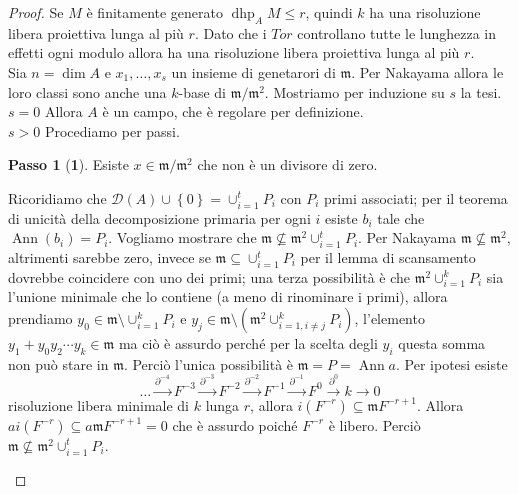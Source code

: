 \documentclass[a4paper,11pt,oneside]{book}
\newcommand{\m}{\mathfrak{m}}
\newcommand{\set}[1]{\left\{ #1 \right\}}
\DeclareMathOperator{\dhp}{dhp}
\DeclareMathOperator{\Ann}{Ann}
\theoremstyle{definition}
\newtheorem*{passo}{Passo}
\begin{document}
     \begin{proof}
      Se $M$ è finitamente generato $\dhp_AM\leq r$, quindi $k$ ha una risoluzione libera proiettiva lunga al più $r$.
      Dato che i $Tor$ controllano tutte le lunghezza in effetti ogni modulo allora ha una risoluzione libera proiettiva
      lunga al più $r$. \\
      Sia $n=\dim A$ e $x_1,\dots, x_s$ un insieme di genetarori di $\m$. Per Nakayama allora le loro classi sono anche una
      $k$-base di $\m/\m^2$. Mostriamo per induzione su $s$ la tesi.\\
      $s=0$ Allora $A$ è un campo, che è regolare per definizione.\\
      $s>0$ Procediamo per passi.\\

	      \begin{passo}[\textbf{1}]
	       Esiste $x\in \m/\m^2$ che non è un divisore di zero.
	      \end{passo}

	      Ricoridiamo che
	      $\mathcal{D}(A)\cup \set{0}=\cup^t_{i=1}P_i$ con $P_i$ primi associati; per il teorema di unicità della decomposizione
	      primaria per ogni $i$ esiste $b_i$ tale che $\Ann (b_i)=P_i$. Vogliamo mostrare che $ \m\nsubseteq \m^2 \cup^t_{i=1}P_i$.
	      Per Nakayama $\m\nsubseteq \m^2$, altrimenti sarebbe zero, invece se $ \m\subseteq\cup^t_{i=1}P_i$
	      per il lemma di scansamento dovrebbe coincidere con uno dei primi; una terza possibilità è che $\m^2\cup^k_{i=1}P_i$ 
	      sia l'unione minimale che lo contiene (a meno di rinominare i primi), allora  prendiamo 
	      $y_0\in \m \setminus\cup^k_{i=1}P_i$  e $y_j\in\m\setminus(\m^2\cup^k_{i=1,i\neq j}P_i)$, l'elemento $y_1+y_0y_2\cdots y_k\in \m$
	      ma ciò è assurdo perché per la scelta degli $y_i$ questa somma non può stare in $\m$.  Perciò l'unica possibilità è $\m=P=\Ann a$.
	      Per ipotesi esiste 
	      \[
	      \dots\xrightarrow{\partial^{-4}}F^{-3}\xrightarrow{\partial^{-3}} F^{-2}\xrightarrow{\partial^{-2}} F^{-1}\xrightarrow{\partial^{-1}}F^0\xrightarrow{\partial^{0}} k\rightarrow 0
	      \]
	      risoluzione libera minimale di $k$ lunga $r$, allora $i(F^{-r})\subseteq \m F^{-r+1}$.
	      Allora $ai(F^{-r})\subseteq a\m F^{-r+1}=0$ che è assurdo poiché $F^{-r}$ è libero. 
	      Perciò  $ \m\nsubseteq \m^2 \cup^t_{i=1}P_i$.\\

			\begin{flushright}
	                 \checkmark
	                \end{flushright}	      
	      

\end{proof}
\end{document}
